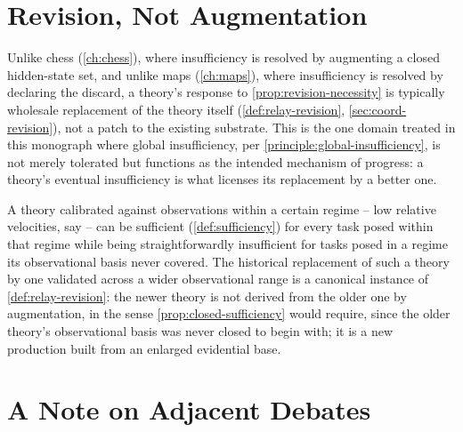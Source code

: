 \section{Revision, Not Augmentation}

Unlike chess (\cref{ch:chess}), where insufficiency is resolved by
augmenting a closed hidden-state set, and unlike maps
(\cref{ch:maps}), where insufficiency is resolved by declaring the
discard, a theory's response to \cref{prop:revision-necessity} is
typically wholesale replacement of the theory itself
(\cref{def:relay-revision}, \cref{sec:coord-revision}), not a patch to
the existing substrate. This is the one domain treated in this monograph
where global insufficiency, per \cref{principle:global-insufficiency},
is not merely tolerated but functions as the intended mechanism of
progress: a theory's eventual insufficiency is what licenses its
replacement by a better one.

\begin{example}
A theory calibrated against observations within a certain regime --
low relative velocities, say -- can be sufficient
(\cref{def:sufficiency}) for every task posed within that regime while
being straightforwardly insufficient for tasks posed in a regime its
observational basis never covered. The historical replacement of such a
theory by one validated across a wider observational range is a
canonical instance of \cref{def:relay-revision}: the newer theory is not
derived from the older one by augmentation, in the sense
\cref{prop:closed-sufficiency} would require, since the older theory's
observational basis was never closed to begin with; it is a new
production built from an enlarged evidential base.
\end{example}

\section{A Note on Adjacent Debates}

